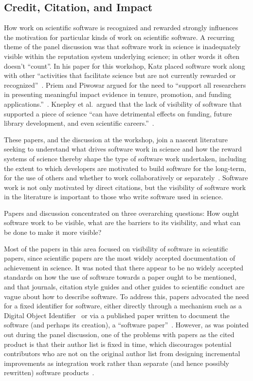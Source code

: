 \documentclass[11pt, oneside]{amsart}
\begin{document}
\subsection{Credit, Citation, and Impact}

How work on scientific software is recognized and rewarded strongly
influences the motivation for particular kinds of work on scientific
software. A recurring theme of the panel discussion was that software
work in science is inadequately visible within the reputation system
underlying science; in other words it often doesn't ``count''. In his
paper for this workshop, Katz placed software work along with other
``activities that facilitate science but are not currently rewarded or
recognized''~\cite{Katz_WSSSPE}. Priem and Piwowar argued for the need
to ``support all researchers in presenting meaningful impact evidence
in tenure, promotion, and funding applications.''~\cite{Priem_WSSSPE}.
Knepley et al.~argued that the lack of visibility of software that
supported a piece of science ``can have detrimental effects on
funding, future library development, and even scientific
careers.''~\cite{Knepley_WSSSPE}.

These papers, and the discussion at the workshop, join a nascent
literature seeking to understand what drives software work in science
and how the reward systems of science thereby shape the type of
software work undertaken, including the extent to which developers are
motivated to build software for the long-term, for the use of others
and whether to work collaboratively or
separately~\cite{howison_incentives_2013, howison_scientific_2011,
  bietz_synergizing_2010}. Software work is not only motivated by
direct citations, but the visibility of software work in the
literature is important to those who write software used in science.

Papers and discussion concentrated on three overarching questions: How
ought software work to be visible, what are the barriers to its
visibility, and what can be done to make it more visible?

Most of the papers in this area focused on visibility of software in
scientific papers, since scientific papers are the most widely
accepted documentation of achievement in science. It was noted that
there appear to be no widely accepted standards on how the use of
software towards a paper ought to be mentioned, and that journals,
citation style guides and other guides to scientific conduct are vague
about how to describe software. To address this, papers advocated the
need for a fixed identifier for software, either directly through a
mechanism such as a Digital Object
Identifier~\cite{Katz_WSSSPE,Knepley_WSSSPE} or via a published paper
written to document the software (and perhaps its creation), a
``software paper''~\cite{Chue_Hong_WSSSPE}. However, as was pointed
out during the panel discussion, one of the problems with papers as
the cited product is that their author list is fixed in time, which
discourages potential contributors who are not on the original author
list from designing incremental improvements as integration work
rather than separate (and hence possibly rewritten) software
products~\cite{howison_incentives_2013}.
\end{document}
